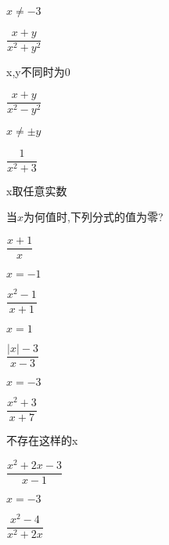 \documentclass[cn,blue,12pt]{elegantbook}
\begin{document}
\begin{xiti}[resume]
\begin{multicols}{2}
\begin{xiti}
\begin{solution}
    \(x \ne -3\)\\
\end{solution}
        \item \(\dfrac{x+y}{x^2+y^2}\)
\begin{solution}
                x,y不同时为0\\
\end{solution}
        \item \(\dfrac{x+y}{x^2-y^2}\)
\begin{solution}
                \(x\ne \pm y\)\\
\end{solution}
        \item \(\dfrac{1}{x^2+3}\)
\begin{solution}
                x取任意实数\\
\end{solution}
        \end{xiti}
    \end{multicols}
\item 当\( x \)为何值时,下列分式的值为零?
    \begin{multicols}{2}
        \begin{xiti}
            \setlength{\itemsep}{1.5ex}
        \item \(\dfrac{x+1}{x}\)
\begin{solution}
                \(x=-1\)\\
\end{solution}
        \item \(\dfrac{x^2-1}{x+1}\)
\begin{solution}
                \(x=1\)\\
\end{solution}
        \item \(\dfrac{|x|-3}{x-3}\)
\begin{solution}
                \(x=-3\)\\
\end{solution}
        \item \(\dfrac{x^2+3}{x+7}\)
\begin{solution}
                不存在这样的x\\
\end{solution}
        \item \(\dfrac{x^2+2x-3}{x-1}\)
\begin{solution}
                \(x=-3\)\\
\end{solution}
        \item \(\dfrac{x^2-4}{x^2+2x}\)

\end{xiti}
\end{multicols}
\end{xiti}
\end{document}
